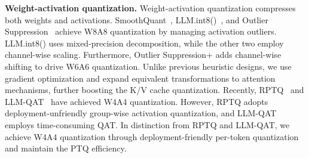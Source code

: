 \documentclass{article} %
\begin{document}
\textbf{Weight-activation quantization.} Weight-activation quantization compresses both weights and activations. SmoothQuant~\citep{smoothquant}, LLM.int8()~\citep{llmint8}, and Outlier Suppression~\citep{outlier} achieve W8A8 quantization by managing activation outliers. LLM.int8() uses mixed-precision decomposition, while the other two employ channel-wise scaling. Furthermore, Outlier Suppression+\citep{outlier-plus} adds channel-wise shifting to drive W6A6 quantization. Unlike previous heuristic designs, we use gradient optimization and expand equivalent transformations to attention mechanisms, further boosting the K/V cache quantization.
%
Recently, RPTQ~\citep{rptq} and LLM-QAT~\citep{llmqat} have achieved W4A4 quantization. However, RPTQ adopts deployment-unfriendly group-wise activation quantization, and LLM-QAT employs time-consuming QAT. In distinction from RPTQ and LLM-QAT, we achieve W4A4 quantization through deployment-friendly per-token quantization and maintain the PTQ efficiency.

\end{document}
